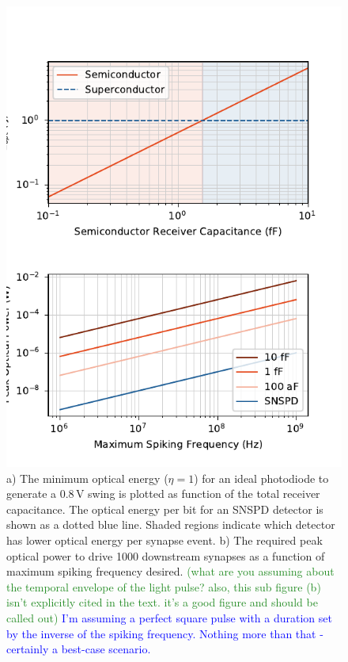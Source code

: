 \documentclass[twocolumn]{article}
\begin{document}
\begin{figure}
    \centering
    \includegraphics[scale=1]{opticalv2.pdf}
    \caption{a) The minimum optical energy ($\eta = 1$) for an ideal photodiode to generate a 0.8\,V swing is plotted as function of the total receiver capacitance. The optical energy per bit for an SNSPD detector is shown as a dotted blue line. Shaded regions indicate which detector has lower optical energy per synapse event. b) The required peak optical power to drive 1000 downstream synapses as a function of maximum spiking frequency desired. \textcolor{ForestGreen}{(what are you assuming about the temporal envelope of the light pulse? also, this sub figure (b) isn't explicitly cited in the text. it's a good figure and should be called out)} \textcolor{blue}{I'm assuming a perfect square pulse with a duration set by the inverse of the spiking frequency. Nothing more than that - certainly a best-case scenario.}}
    \label{fig:communication}
\end{figure}
\end{document}

